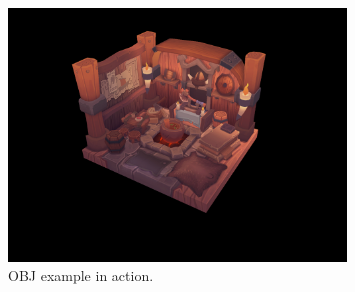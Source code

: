 \documentclass[12pt]{report}
\theoremstyle{definition}
\begin{document}
    \clearpage

      \begin{figure}[h]
        \centering
        \includegraphics[width=0.8\textwidth]{images/obj_example.png}
        \caption{OBJ example in action.}
        \label{fig:obj_example}  
      \end{figure}
\end{document}
